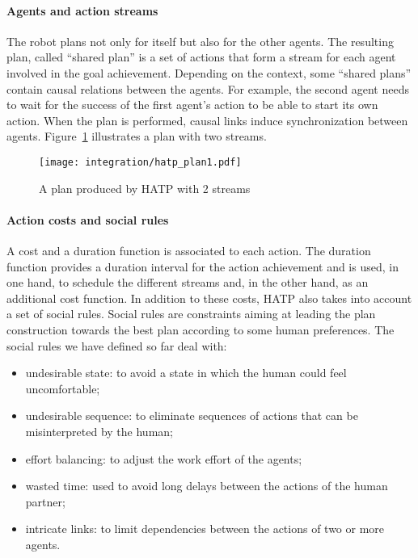 \paragraph{Agents and action streams} The robot plans not only for itself but
also for the other agents. The resulting plan, called ``shared plan'' is a set
of actions that form a stream for each agent involved in the goal achievement.
Depending on the context, some ``shared plans'' contain causal relations
between the agents. For example, the second agent needs to wait for the success
of the first agent's action to be able to start its own action. When the plan
is performed, causal links induce synchronization between agents.
Figure~\ref{plan_hatp1} illustrates a plan with two streams.

\begin{figure}[htbp]
  \centering
  \texttt{[image: integration/hatp\_plan1.pdf]}
  \caption{A plan produced by HATP with 2 streams}
  \label{plan_hatp1}
\end{figure}

\paragraph{Action costs and social rules} A cost and a duration function is
associated to each action.  The duration function provides a duration interval
for the action achievement and is used, in one hand, to schedule the different
streams and, in the other hand, as an additional cost function.  In addition to
these costs, HATP also takes into account a set of social rules.  Social rules
are constraints aiming at leading the plan construction towards the best plan
according to some human preferences. The social rules we have defined so far
deal with:

\begin{itemize}

    \item undesirable state: to avoid a state in which the human could feel
    uncomfortable;

    \item undesirable sequence: to eliminate sequences of actions that can be
    misinterpreted by the human;

    \item effort balancing: to adjust the work effort of the agents;

    \item wasted time: used to avoid long delays between the actions of the
    human partner;

    \item intricate links: to limit dependencies between the actions of two or
    more agents.

\end{itemize}

